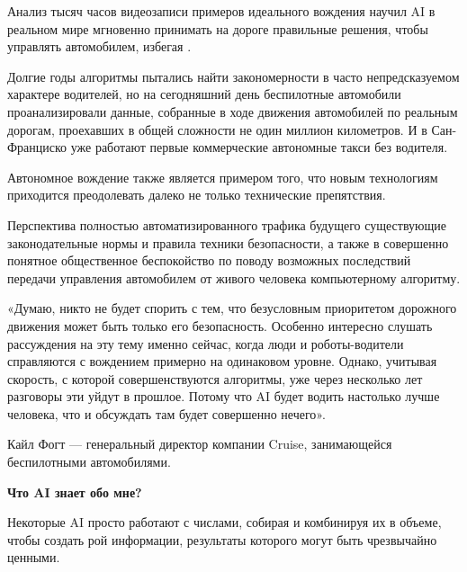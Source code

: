 Анализ тысяч часов видеозаписи примеров идеального вождения научил AI в реальном мире мгновенно принимать на дороге правильные решения, чтобы управлять автомобилем, избегая .

Долгие годы алгоритмы пытались найти закономерности в часто непредсказуемом характере водителей, но на сегодняшний день беспилотные автомобили проанализировали данные, собранные в ходе движения автомобилей по реальным дорогам, проехавших в общей сложности не один миллион километров. И в Сан-Франциско уже работают первые коммерческие автономные такси без водителя.

Автономное вождение также является  примером того, что новым технологиям приходится преодолевать далеко не только технические препятствия.

Перспектива полностью автоматизированного трафика будущего  существующие законодательные нормы и правила техники безопасности, а также в совершенно понятное общественное беспокойство по поводу возможных последствий передачи управления автомобилем от живого человека компьютерному алгоритму.

\begin{fancyquotes}
    «Думаю, никто не будет спорить с тем, что безусловным приоритетом дорожного движения может быть только его безопасность. Особенно интересно слушать рассуждения на эту тему именно сейчас, когда люди и роботы-водители справляются с вождением примерно на одинаковом уровне. Однако, учитывая скорость, с которой совершенствуются алгоритмы, уже через несколько лет разговоры эти уйдут в прошлое. Потому что AI будет водить настолько лучше человека, что и обсуждать там будет совершенно нечего».\\

    \begin{flushright}
        Кайл Фогт — генеральный директор компании Cruise, занимающейся беспилотными автомобилями.
    \end{flushright}
\end{fancyquotes}

\textbf{Что AI знает обо мне?}

Некоторые AI просто работают с числами, собирая и комбинируя их в объеме, чтобы создать рой информации, результаты которого могут быть чрезвычайно ценными.

